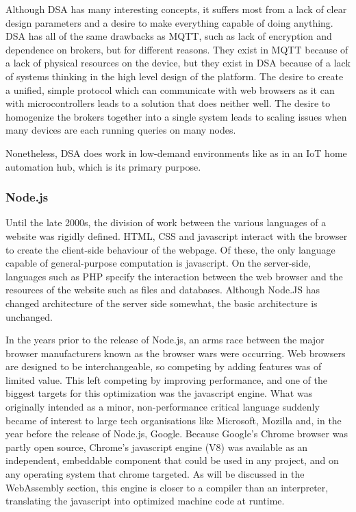 \documentclass{article}
\begin{document}
Although DSA has many interesting concepts, it suffers most from a lack of clear design parameters and a desire to make everything capable of doing anything. DSA has all of the same drawbacks as MQTT, such as lack of encryption and dependence on brokers, but for different reasons. They exist in MQTT because of a lack of physical resources on the device, but they exist in DSA because of a lack of systems thinking in the high level design of the platform. The desire to create a unified, simple protocol which can communicate with web browsers as it can with microcontrollers leads to a solution that does neither well. The desire to homogenize the brokers together into a single system leads to scaling issues when many devices are each running queries on many nodes. 

Nonetheless, DSA does work in low-demand environments like as in an IoT home automation hub, which is its primary purpose.

\subsubsection{Node.js}

Until the late 2000s, the division of work between the various languages of a website was rigidly defined. HTML, CSS and javascript interact with the browser to create the client-side behaviour of the webpage. Of these, the only language capable of general-purpose computation is javascript. On the server-side, languages such as PHP specify the interaction between the web browser and the resources of the website such as files and databases. Although Node.JS has changed architecture of the server side somewhat, the basic architecture is unchanged.

In the years prior to the release of Node.js, an arms race between the major browser manufacturers known as the browser wars \cite{war} were occurring. Web browsers are designed to be interchangeable, so competing by adding features was of limited value. This left competing by improving performance, and one of the biggest targets for this optimization was the javascript engine. What was originally intended as a minor, non-performance critical language suddenly became of interest to large tech organisations like Microsoft, Mozilla and, in the year before the release of Node.js, Google. Because Google's Chrome browser was partly open source, Chrome's javascript engine (V8) was available as an independent, embeddable component that could be used in any project, and on any operating system that chrome targeted. As will be discussed in the WebAssembly section, this engine is closer to a compiler than an interpreter, translating the javascript into optimized machine code at runtime.
\end{document}
